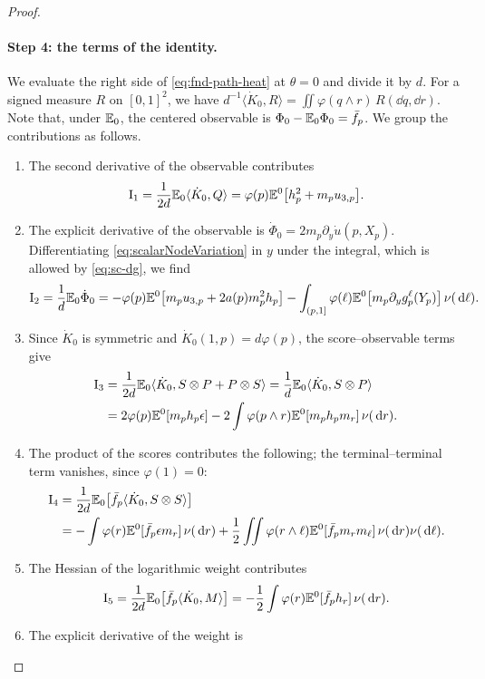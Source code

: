 \begin{proof}
\paragraph{Step 4: the terms of the identity.}
We evaluate the right side of \eqref{eq:fnd-path-heat} at $\theta=0$
and divide it by $d$. For a signed measure $R$ on $[0,1]^2$, we have
$d^{-1}\langle\dot K_0,R\rangle=\iint\varphi(q\wedge r)\,R(\dd q,\dd r)$.
Note that, under $\mathbb E_0$, the centered observable is
$\Phi_0-\mathbb E_0\Phi_0=\bar f_p$.
We group the contributions as follows.
\begin{enumerate}
\item The second derivative of the observable contributes
 \[
  \mathrm I_1=\frac1{2d}\mathbb E_0\langle\dot K_0,Q\rangle
  =\varphi(p)\mathbb E^0\bigl[h_p^2+m_pu_{3,p}\bigr].
 \]
\item The explicit derivative of the observable is
 $\dot\Phi_0=2m_p\partial_y\dot u(p,X_p)$. Differentiating
 \eqref{eq:scalarNodeVariation} in $y$ under the integral, which is
 allowed by \eqref{eq:sc-dg}, we find
 \[
  \mathrm I_2=\frac1d\mathbb E_0\dot\Phi_0
  =-\varphi(p)\mathbb E^0\bigl[m_pu_{3,p}+2a(p)m_p^2h_p\bigr]
  -\int_{(p,1]}\varphi(\ell)\mathbb E^0\bigl[m_p\partial_yg_p^\ell(Y_p)\bigr]
   \,\nu(\,\mathrm d\ell).
 \]
\item Since $\dot K_0$ is symmetric and $\dot K_0(1,p)=d\varphi(p)$,
 the score--observable terms give
 \[
  \begin{aligned}
  \mathrm I_3&=\frac1{2d}\mathbb E_0\langle\dot K_0,S\otimes P+P\otimes S\rangle
  =\frac1d\mathbb E_0\langle\dot K_0,S\otimes P\rangle\\
  &=2\varphi(p)\mathbb E^0[m_ph_p\epsilon]
  -2\int\varphi(p\wedge r)\mathbb E^0[m_ph_pm_r]\,\nu(\,\mathrm d r).
  \end{aligned}
 \]
\item The product of the scores contributes the following; the
 terminal--terminal term vanishes, since $\varphi(1)=0$:
 \[
  \begin{aligned}
  \mathrm I_4&=\frac1{2d}\mathbb E_0\bigl[\bar f_p\langle\dot K_0,S\otimes S\rangle\bigr]\\
  &=-\int\varphi(r)\mathbb E^0[\bar f_p\epsilon m_r]\,\nu(\,\mathrm d r)
  +\frac12\iint\varphi(r\wedge\ell)\mathbb E^0[\bar f_pm_rm_\ell]
   \,\nu(\,\mathrm d r)\nu(\,\mathrm d\ell).
  \end{aligned}
 \]
\item The Hessian of the logarithmic weight contributes
 \[
  \mathrm I_5=\frac1{2d}\mathbb E_0\bigl[\bar f_p\langle\dot K_0,M\rangle\bigr]
  =-\frac12\int\varphi(r)\mathbb E^0[\bar f_ph_r]\,\nu(\,\mathrm d r).
 \]
\item The explicit derivative of the weight is

\end{enumerate}
\end{proof}
